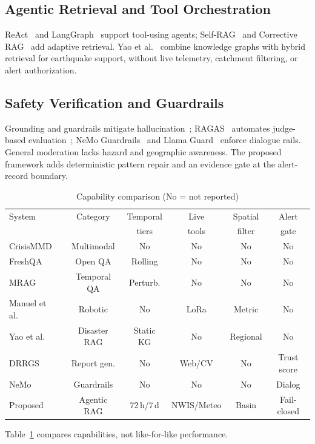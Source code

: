 \documentclass[conference]{IEEEtran}
\begin{document}
\subsection{Agentic Retrieval and Tool Orchestration}
ReAct~\cite{react} and LangGraph~\cite{langgraph} support tool-using agents; Self-RAG~\cite{selfrag} and Corrective RAG~\cite{crag} add adaptive retrieval. Yao et al.~\cite{yao2025} combine knowledge graphs with hybrid retrieval for earthquake support, without live telemetry, catchment filtering, or alert authorization.

\subsection{Safety Verification and Guardrails}
Grounding and guardrails mitigate hallucination~\cite{ji,yu2024}; RAGAS~\cite{ragas} automates judge-based evaluation~\cite{zheng}; NeMo Guardrails~\cite{nemoguardrails} and Llama Guard~\cite{inan2023} enforce dialogue rails. General moderation lacks hazard and geographic awareness. The proposed framework adds deterministic pattern repair and an evidence gate at the alert-record boundary.

\begin{table}[t]
\caption{Capability comparison (No = not reported)}
\label{tab:lit}
\centering\scriptsize\setlength{\tabcolsep}{2pt}
\begin{tabular*}{\columnwidth}{@{\extracolsep{\fill}}lccccc@{}}
\toprule
System & Category & Temporal & Live & Spatial & Alert \\
        &          & tiers & tools & filter & gate \\
\midrule
CrisisMMD~\cite{crisismmd} & Multimodal & No & No & No & No \\
FreshQA~\cite{freshqa} & Open QA & Rolling & No & No & No \\
MRAG~\cite{mrag2025} & Temporal QA & Perturb. & No & No & No \\
Manuel et al.~\cite{manuel2024} & Robotic & No & LoRa & Metric & No \\
Yao et al.~\cite{yao2025} & Disaster RAG & Static KG & No & Regional & No \\
DRRGS~\cite{drrgs2026} & Report gen. & No & Web/CV & No & Trust score \\
NeMo~\cite{nemoguardrails} & Guardrails & No & No & No & Dialog \\
\midrule
Proposed & Agentic RAG & 72\,h/7\,d & NWIS/Meteo & Basin & Fail-closed \\
\bottomrule
\end{tabular*}
\end{table}
Table~\ref{tab:lit} compares capabilities, not like-for-like performance.
\end{document}
